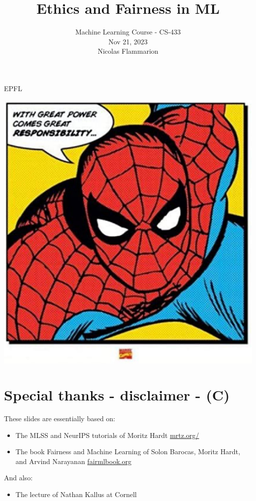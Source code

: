 \documentclass[10pt]{article}
\title{Ethics and Fairness in ML }
\author{Machine Learning Course - CS-433\\
Nov 21, 2023\\
Nicolas Flammarion}
\date{}
\begin{document}
\maketitle
EPFL

\begin{center}
\includegraphics[max width=\textwidth]{2024_01_08_7c1a383b1e6170f910e4g-02}
\end{center}

\section*{Special thanks - disclaimer - (C)}
These slides are essentially based on:

\begin{itemize}
  \item The MLSS and NeurIPS tutorials of Moritz Hardt \href{http://mrtz.org/}{mrtz.org/}
  \item The book Fairness and Machine Learning of Solon Barocas, Moritz Hardt, and Arvind Narayanan \href{http://fairmlbook.org}{fairmlbook.org}
\end{itemize}

And also:

\begin{itemize}
  \item The lecture of Nathan Kallus at Cornell
\end{itemize}
\end{document}

